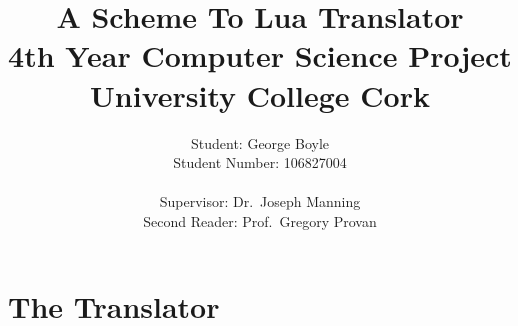 \documentclass[a4paper,12pt,twoside,openany]{report} %
\begin{document}
\title{A Scheme To Lua Translator \\
{\small 4th Year Computer Science Project} \\
{\small University College Cork}}
\author{Student: George Boyle \\ Student Number: 106827004 \\ \\
Supervisor: Dr.\ Joseph Manning \\
Second Reader: Prof.\ Gregory Provan}


%
%

\begin{comment} %
\maketitle

\tableofcontents


%
%

\chapter{Background (10 pages)}


\chapter{Project Administration}

\end{comment} %

\chapter{The Translator}


\begin{comment} %
\chapter{Testing}


\chapter{Conclusion (5 pages)}



%
%

\appendix

\chapter{Program Source Code}


\chapter{Open Day Materials}



%
%


\end{comment} %
\end{document}
